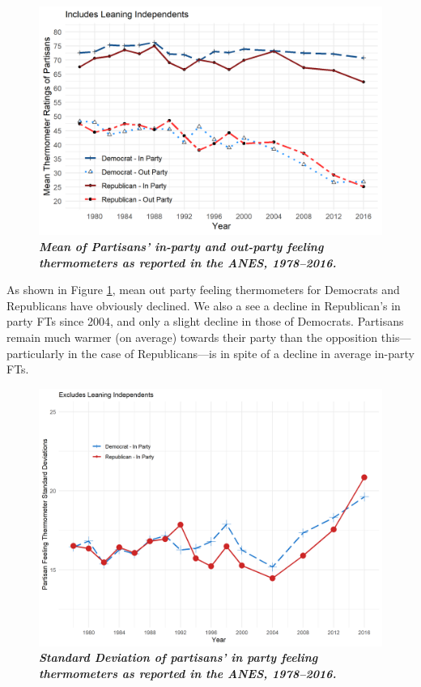 \documentclass[12pt]{paper}
\begin{document}
\begin{figure}[H]
\centering
\includegraphics[width=.8\textwidth]{cdf-mean-ns.png}
\caption{\label{fig:cdf-mean} \textit{\textbf{Mean of Partisans' in-party and out-party feeling thermometers as reported in the ANES, 1978--2016.}%
}}
\end{figure}
As shown in Figure \ref{fig:cdf-mean}, mean out party feeling thermometers for Democrats and Republicans have obviously declined. We also a see a decline in Republican's in party FTs since 2004, and only a slight decline in those of Democrats. Partisans remain much warmer (on average) towards their party than the opposition this---particularly in the case of Republicans---is in spite of a decline in average in-party FTs.

\begin{figure}
\centering
\includegraphics[width=.75\textwidth]{cdf-sd.png}
\caption{\label{fig:cdf-sd} \textit{\textbf{Standard Deviation of partisans' in party feeling thermometers as reported in the ANES, 1978--2016.} %
}}
\end{figure}
\end{document}
